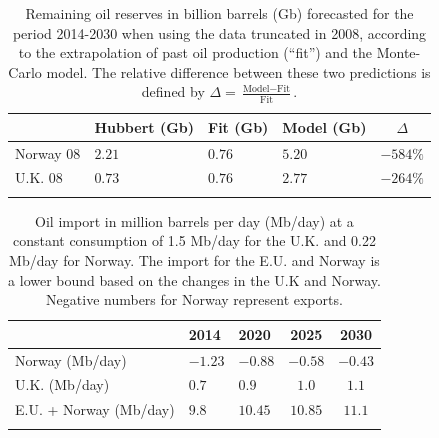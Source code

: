 \documentclass[review]{elsarticle}
\providecommand{\tabularnewline}{\\}
\begin{document}
\pagebreak


\begin{table}[H]
\caption{Remaining oil reserves in billion barrels (Gb) forecasted for the period 2014-2030 when using the data truncated in 2008, according to the extrapolation of past oil production (``fit'') and the Monte-Carlo model. The relative difference between these two predictions 
is defined by $\Delta=\frac{\textrm{Model}-\textrm{Fit}}{\textrm{Fit}}$.}
\centering %
\begin{tabular}{llllc}
 & Hubbert (Gb) & Fit (Gb) & Model (Gb) & $\Delta$ \tabularnewline
\midrule Norway 08 & $2.21$ & $0.76$ & $5.20$  & $-584\%$\tabularnewline
U.K. 08 & $0.73$ & $0.76$ & $2.77$ & $-264\%$ \tabularnewline
\bottomrule  &  &  & \tabularnewline
\end{tabular}\label{forecast-08}
\end{table}

\pagebreak


\begin{table}[H]
\caption{Oil import in million barrels per day (Mb/day) at a constant consumption of 1.5 Mb/day for the U.K. and 0.22 Mb/day for Norway. The import for the E.U. and Norway is a lower bound based on the changes in the U.K and Norway. Negative numbers for Norway represent exports.}
\centering %
\begin{tabular}{lllcc}
 & 2014 & 2020 & 2025 & 2030\tabularnewline
\midrule Norway (Mb/day) & $-1.23$  & $-0.88$  & $-0.58$  & $-0.43$ \tabularnewline
U.K. (Mb/day) & $0.7$  & $0.9$  & $1.0$  & $1.1$ \tabularnewline
E.U. + Norway (Mb/day) & $9.8$  & $10.45$  & $10.85$  & $11.1$ \tabularnewline
\bottomrule  &  &  &  & \tabularnewline
\end{tabular}\label{needs}
\end{table}
\end{document}
